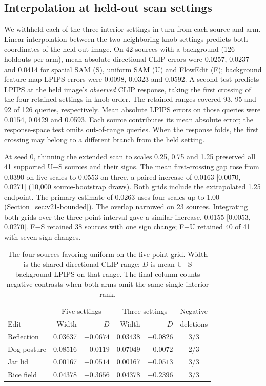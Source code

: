 \subsection{Interpolation at held-out scan settings}
\label{sec:v21-grid}

We withheld each of the three interior settings in turn from each source and arm. Linear interpolation between the two neighboring knob settings predicts both coordinates of the held-out image. On 42 sources with a background (126 holdouts per arm), mean absolute directional-CLIP errors were 0.0257, 0.0237 and 0.0414 for spatial SAM (S), uniform SAM (U) and FlowEdit (F); background feature-map LPIPS errors were 0.0098, 0.0323 and 0.0592. A second test predicts LPIPS at the held image's \emph{observed} CLIP response, taking the first crossing of the four retained settings in knob order. The retained ranges covered 93, 95 and 92 of 126 queries, respectively. Mean absolute LPIPS errors on those queries were 0.0154, 0.0429 and 0.0593. Each source contributes its mean absolute error; the response-space test omits out-of-range queries. When the response folds, the first crossing may belong to a different branch from the held setting.

At seed 0, thinning the extended scan to scales 0.25, 0.75 and 1.25 preserved all 41 supported U$-$S sources and their signs. The mean first-crossing gap rose from 0.0390 on five scales to 0.0553 on three, a paired increase of 0.0163 [0.0070, 0.0271] (10,000 source-bootstrap draws). Both grids include the extrapolated 1.25 endpoint. The primary estimate of 0.0263 uses four scales up to 1.00 (Section~\ref{sec:v21-bounded}). The overlap narrowed on 23 sources. Integrating both grids over the three-point interval gave a similar increase, 0.0155 [0.0053, 0.0270]. F$-$S retained 38 sources with one sign change; F$-$U retained 40 of 41 with seven sign changes.

\begin{table}[t]
\centering\footnotesize
\caption{The four sources favoring uniform on the five-point grid. Width is the shared directional-CLIP range; $D$ is mean U$-$S background LPIPS on that range. The final column counts negative contrasts when both arms omit the same single interior rank.}
\label{tab:v21-grid-exceptions}
\setlength{\tabcolsep}{3pt}
\begin{tabular}{@{}lrrrrc@{}}
\hline
& \multicolumn{2}{c}{Five settings} & \multicolumn{2}{c}{Three settings} & Negative\\
Edit & Width & $D$ & Width & $D$ & deletions\\
\hline
Reflection & 0.03637 & $-0.0674$ & 0.03438 & $-0.0826$ & 3/3\\
Dog posture & 0.08516 & $-0.0119$ & 0.07049 & $-0.0072$ & 2/3\\
Jar lid & 0.00167 & $-0.0514$ & 0.00167 & $-0.0513$ & 3/3\\
Rice field & 0.04378 & $-0.3656$ & 0.04378 & $-0.2396$ & 3/3\\
\hline
\end{tabular}
\end{table}

